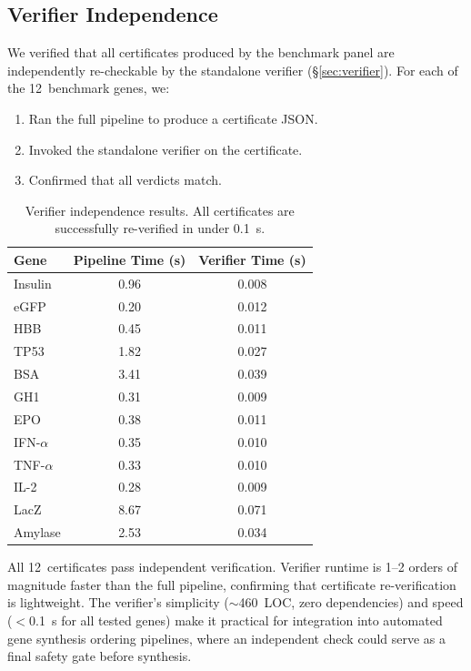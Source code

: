 \subsection{Verifier Independence}\label{sec:verifiereval}

We verified that all certificates produced by the benchmark panel are
independently re-checkable by the standalone verifier
(\S\ref{sec:verifier}).  For each of the 12~benchmark genes, we:

\begin{enumerate}[leftmargin=*,itemsep=0pt,topsep=1pt]
\item Ran the full pipeline to produce a certificate JSON.
\item Invoked the standalone verifier on the certificate.
\item Confirmed that all verdicts match.
\end{enumerate}

\begin{table}[t]
\centering
\caption{Verifier independence results.  All certificates are
         successfully re-verified in under 0.1~s.}
\label{tab:verifier}
\begin{tabular}{lcc}
\toprule
\textbf{Gene} & \textbf{Pipeline Time (s)} & \textbf{Verifier Time (s)} \\
\midrule
Insulin      & 0.96  & 0.008 \\
eGFP         & 0.20  & 0.012 \\
HBB          & 0.45  & 0.011 \\
TP53         & 1.82  & 0.027 \\
BSA          & 3.41  & 0.039 \\
GH1          & 0.31  & 0.009 \\
EPO          & 0.38  & 0.011 \\
IFN-$\alpha$ & 0.35  & 0.010 \\
TNF-$\alpha$ & 0.33  & 0.010 \\
IL-2         & 0.28  & 0.009 \\
LacZ         & 8.67  & 0.071 \\
Amylase      & 2.53  & 0.034 \\
\bottomrule
\end{tabular}
\end{table}

All 12~certificates pass independent verification.  Verifier runtime is
1--2 orders of magnitude faster than the full pipeline, confirming that
certificate re-verification is lightweight.  The verifier's simplicity
($\sim$460~LOC, zero dependencies) and speed ($<$0.1~s for all tested
genes) make it practical for integration into automated gene synthesis
ordering pipelines, where an independent check could serve as a final
safety gate before synthesis.


